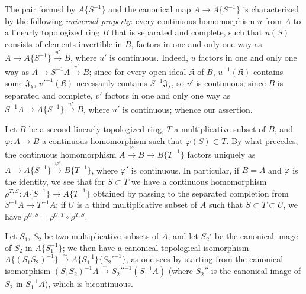 \begin{env}[7.6.6]
\label{0.7.6.6}
The pair formed by $A\{S^{-1}\}$ and the canonical map
$A\to A\{S^{-1}\}$ is characterized by the following \emph{universal
property}: every continuous homomorphism $u$ from $A$ to a linearly
topologized ring $B$ that is separated and complete, such that $u(S)$ consists of elements
invertible in $B$, factors in one and only one way as
$A\to A\{S^{-1}\}\xrightarrow{u'}B$, where $u'$ is continuous. Indeed, $u$
factors in one and only one way as $A\to S^{-1}A\xrightarrow{v'}B$; since for
every open ideal $\mathfrak K$ of $B$, $u^{-1}(\mathfrak K)$ contains some
$\mathfrak J_\lambda$, ${v'}^{-1}(\mathfrak K)$ necessarily contains
$S^{-1}\mathfrak J_\lambda$, so $v'$ is continuous; since $B$ is separated and
complete, $v'$ factors in one and only one way as
$S^{-1}A\to A\{S^{-1}\}\xrightarrow{u'}B$, where $u'$ is continuous; whence our
assertion.
\end{env}

\begin{env}[7.6.7]
\label{0.7.6.7}
Let $B$ be a second linearly topologized ring, $T$ a multiplicative
subset of $B$, and $\varphi:A\to B$ a continuous homomorphism such that
$\varphi(S)\subset T$. By what precedes, the continuous homomorphism
$A\xrightarrow{\varphi}B\to B\{T^{-1}\}$ factors uniquely as
$A\to A\{S^{-1}\}\xrightarrow{\varphi'}B\{T^{-1}\}$, where $\varphi'$ is
continuous. In particular, if $B=A$ and $\varphi$ is the identity, we see that
for $S\subset T$ we have a continuous homomorphism
$\rho^{T,S}:A\{S^{-1}\}\to A\{T^{-1}\}$ obtained by passing to the separated completion
from $S^{-1}A\to T^{-1}A$; if $U$ is a third multiplicative
subset of $A$ such that $S\subset T\subset U$, we have
$\rho^{U,S}=\rho^{U,T}\circ\rho^{T,S}$.
\end{env}

\begin{env}[7.6.8]
\label{0.7.6.8}
Let $S_1$, $S_2$ be two multiplicative subsets of $A$, and let $S_2'$ be the
canonical image of $S_2$ in $A\{S_1^{-1}\}$; we then have a canonical topological
isomorphism
$A\{(S_1S_2)^{-1}\}\xrightarrow{\sim}A\{S_1^{-1}\}\{{S_2'}^{-1}\}$,
as one sees by starting from the canonical isomorphism
$(S_1S_2)^{-1}A\xrightarrow{\sim}{S_2''}^{-1}(S_1^{-1}A)$ (where $S_2''$ is
the canonical image of $S_2$ in $S_1^{-1}A$), which is bicontinuous.
\end{env}

